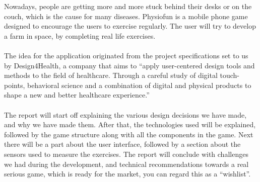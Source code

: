 Nowadays, people are getting more and more stuck behind their desks or on the couch, which is the cause for many diseases. Physiofun is a mobile phone game designed to encourage the users to exercise regularly. The user will try to develop a farm in space, by completing real life exercises.\\
\\
The idea for the application originated from the project specifications set to us by Design4Health, a company that aims to ``apply user-centered design tools and methods to the field of healthcare. Through a careful study of digital touch-points, behavioral science and a combination of digital and physical products to shape a new and better healthcare experience.''\\
\\
The report will start off explaining the various design decisions we have made, and why we have made them. After that, the technologies used will be explained, followed by the game structure along with all the components in the game. Next there will be a part about the user interface, followed by a section about the sensors used to measure the exercises. The report will conclude with challenges we had during the development, and technical recommendations towards a real serious game, which is ready for the market, you can regard this as a ``wishlist''.